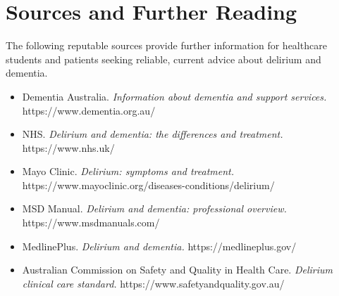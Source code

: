 \section*{Sources and Further Reading}
The following reputable sources provide further information for healthcare students and patients seeking reliable, current advice about delirium and dementia.

\begin{itemize}
    \item Dementia Australia. \textit{Information about dementia and support services.} https://www.dementia.org.au/
    \item NHS. \textit{Delirium and dementia: the differences and treatment.} https://www.nhs.uk/
    \item Mayo Clinic. \textit{Delirium: symptoms and treatment.} https://www.mayoclinic.org/diseases-conditions/delirium/
    \item MSD Manual. \textit{Delirium and dementia: professional overview.} https://www.msdmanuals.com/
    \item MedlinePlus. \textit{Delirium and dementia.} https://medlineplus.gov/
    \item Australian Commission on Safety and Quality in Health Care. \textit{Delirium clinical care standard.} https://www.safetyandquality.gov.au/
\end{itemize}
